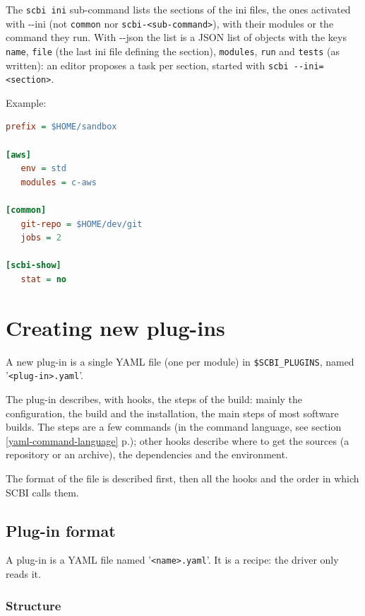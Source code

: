 \documentclass[a4paper,12pt,twoside]{article}
\newcommand{\code}[1]{\texttt{#1}}
\newcommand{\seeref}[1]{see section \ref{#1} p.\pageref{#1}}
\newcommand{\file}[1]{'{\texttt{#1}}'}
\let\stdsection\section
\renewcommand\section{\newpage\stdsection}
\newcommand{\ddash}{-{}-}
\begin{document}
The \code{scbi ini} sub-command lists the sections of the ini files, the
ones activated with \ddash{}ini (not \code{common} nor
\code{scbi-<sub-command>}), with their modules or the command they run.
With \ddash{}json the list is a JSON list of objects with the keys
\code{name}, \code{file} (the last ini file defining the section),
\code{modules}, \code{run} and \code{tests} (as written): an editor
proposes a task per section, started with \code{scbi \ddash{}ini=<section>}.

Example:

\begin{lstlisting}[language={Ini}]
prefix = $HOME/sandbox

[aws]
   env = std
   modules = c-aws

[common]
   git-repo = $HOME/dev/git
   jobs = 2

[scbi-show]
   stat = no
\end{lstlisting}


\section{Creating new plug-ins}

A new plug-in is a single YAML file (one per module) in
\code{\$SCBI\_PLUGINS}, named \file{<plug-in>.yaml}.

The plug-in describes, with hooks, the steps of the build: mainly the
configuration, the build and the installation, the main steps of most
software builds. The steps are a few commands (in the command language,
\seeref{yaml-command-language}); other hooks describe where to get the
sources (a repository or an archive), the dependencies and the environment.

The format of the file is described first, then all the hooks and the
order in which SCBI calls them.

\subsection{Plug-in format}
\label{yaml-plugin}

A plug-in is a YAML file named \file{<name>.yaml}. It is a recipe: the
driver only reads it.

\subsubsection{Structure}
\end{document}
